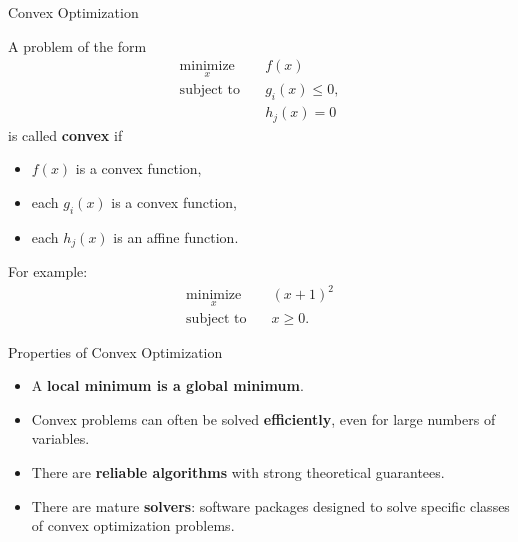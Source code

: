\documentclass{beamer}
\begin{document}
\begin{frame}{Convex Optimization}
	\begin{flushleft}
		A problem of the form
		\[
		\begin{aligned}
			\underset{x}{\text{minimize}}\quad & f(x)\\
			\text{subject to}\quad & g_i(x) \leq 0,\\
			& h_j(x) = 0
		\end{aligned}
		\]
		is called \textbf{convex} if
		
		\begin{itemize}
			\item $f(x)$ is a convex function,
			\item each $g_i(x)$ is a convex function,
			\item each $h_j(x)$ is an affine function.
		\end{itemize}
		
		\bigskip
		
		For example:
		\[
		\begin{aligned}
			\underset{x}{\text{minimize}}\quad &(x+1)^2\\
			\text{subject to}\quad &x \geq 0.
		\end{aligned}
		\]
		
	\end{flushleft}
\end{frame}


\begin{frame}{Properties of Convex Optimization}
	\begin{flushleft}
		\begin{itemize}
			\item A \textbf{local minimum is a global minimum}.
			
			\bigskip
			
			\item Convex problems can often be solved \textbf{efficiently}, even for
			large numbers of variables.
			
			\bigskip
			
			\item There are \textbf{reliable algorithms} with strong theoretical
			guarantees.
			
			\bigskip
			
			\item There are mature \textbf{solvers}: software packages designed
			to solve specific classes of convex optimization problems.
		\end{itemize}
		
	\end{flushleft}
\end{frame}
\end{document}
